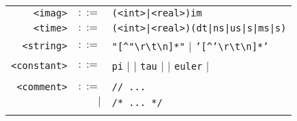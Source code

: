 \documentclass[notitlepage]{article}
\begin{document}
\begin{longtable}{rrl}
	\texttt{<imag>} & $::=$ & \texttt{(<int>|<real>)im} \\
	\texttt{<time>} & $::=$ & \texttt{(<int>|<real>)(dt|ns|us|{\textmu}s|ms|s)} \\
	\texttt{<string>} & $::=$ & \texttt{"[\string^"{\textbackslash}r{\textbackslash}t{\textbackslash}n]*"} $\mid$ \texttt{'[\string^'{\textbackslash}r{\textbackslash}t{\textbackslash}n]*'} \\
	\texttt{<constant>} & $::=$ & \texttt{pi} $\mid$ \texttt{\textpi} $\mid$ \texttt{tau} $\mid$ \texttt{\texttau} $\mid$ \texttt{euler} $\mid$ \texttt{\textepsilon} \\ \\
	\texttt{<comment>} & $::=$ & \texttt{// ...} \\
	& $\mid$ & \texttt{/* ... */} \\ \\
\end{longtable}
\end{document}
